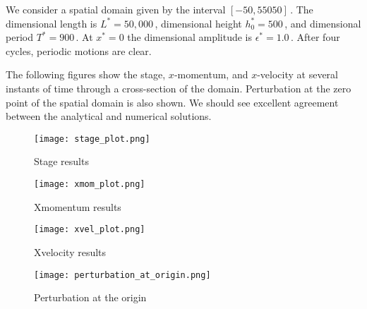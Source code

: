 We consider a spatial domain given by the interval $[-50, 55050]$\,. The dimensional length is $L^*=50,000$\,, dimensional height $h_0^*=500$\,, and dimensional period $T^*=900$\,. At $x^*=0$ the dimensional amplitude is $\epsilon^*=1.0$\,. After four cycles, periodic motions are clear.

The following figures show the stage, $x$-momentum, and $x$-velocity at several instants of time through a cross-section of the domain. Perturbation at the zero point of the spatial domain is also shown.
We should see excellent agreement between the analytical and numerical solutions.

\begin{figure}
\begin{center}
\texttt{[image: stage\_plot.png]}
\end{center}
\caption{Stage results}
\end{figure}

\begin{figure}
\begin{center}
\texttt{[image: xmom\_plot.png]}
\end{center}
\caption{Xmomentum results}
\end{figure}

\begin{figure}
\begin{center}
\texttt{[image: xvel\_plot.png]}
\end{center}
\caption{Xvelocity results}
\end{figure}


\begin{figure}
\begin{center}
\texttt{[image: perturbation\_at\_origin.png]}
\end{center}
\caption{Perturbation at the origin}
\end{figure}


\endinput
